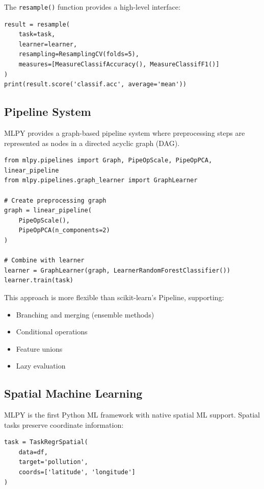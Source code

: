 \documentclass[twoside,11pt]{article}
\begin{document}
The \texttt{resample()} function provides a high-level interface:

\begin{lstlisting}
result = resample(
    task=task,
    learner=learner,
    resampling=ResamplingCV(folds=5),
    measures=[MeasureClassifAccuracy(), MeasureClassifF1()]
)
print(result.score('classif.acc', average='mean'))
\end{lstlisting}

\subsection{Pipeline System}

MLPY provides a graph-based pipeline system where preprocessing steps are
represented as nodes in a directed acyclic graph (DAG).

\begin{lstlisting}
from mlpy.pipelines import Graph, PipeOpScale, PipeOpPCA, linear_pipeline
from mlpy.pipelines.graph_learner import GraphLearner

# Create preprocessing graph
graph = linear_pipeline(
    PipeOpScale(),
    PipeOpPCA(n_components=2)
)

# Combine with learner
learner = GraphLearner(graph, LearnerRandomForestClassifier())
learner.train(task)
\end{lstlisting}

This approach is more flexible than scikit-learn's Pipeline, supporting:
\begin{itemize}
  \item Branching and merging (ensemble methods)
  \item Conditional operations
  \item Feature unions
  \item Lazy evaluation
\end{itemize}

\subsection{Spatial Machine Learning}

MLPY is the first Python ML framework with native spatial ML support. Spatial
tasks preserve coordinate information:

\begin{lstlisting}
task = TaskRegrSpatial(
    data=df,
    target='pollution',
    coords=['latitude', 'longitude']
)
\end{lstlisting}
\end{document}
